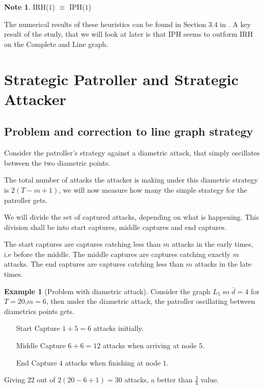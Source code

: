 \documentclass[a4paper,10pt]{article}
\theoremstyle{definition}
\theoremstyle{definition}
\newtheorem{example}[theorem]{Example}
\theoremstyle{remark}
\theoremstyle{definition}
\newtheorem*{note}{Note}
\begin{document}
\begin{note}
IRH($1$) $\equiv$ IPH($1$)
\end{note}

The numerical results of these heuristics can be found in Section 3.4 in \citep{Lin2013}. A key result of the study, that we will look at later is that IPH seems to outform IRH on the Complete and Line graph.

\section{Strategic Patroller and Strategic Attacker}

\subsection{Problem and correction to line graph strategy}
\label{Subsection:Problem and correction to line graph strategy}
Consider the patroller's strategy against a diametric attack, that simply oscillates between the two diametric points.

The total number of attacks the attacker is making under this diametric strategy is $2(T-m+1)$, we will now measure how many the simple strategy for the patroller gets.

We will divide the set of captured attacks, depending on what is happening. This division shall be into start captures, middle captures and end captures.

The start captures are captures catching less than $m$ attacks in the early times, i.e before the middle. The middle captures are captures catching exactly $m$ attacks. The end captures are captures catching less than $m$ attacks in the late times.

\begin{example}[Problem with diametric attack]
Consider the graph $L_{5}$ so $\bar{d}=4$ for $T=20$,$m=6$, then under the diametric attack, the patroller oscillating between diametrics points gets.
\begin{itemize}
\item[Start] Capture $1+5=6$ attacks initially.
\item[Middle] Capture $6+6=12$ attacks when arriving at node $5$.
\item[End] Capture $4$ attacks when finishing at node $1$.
\end{itemize}
Giving $22$ out of $2(20-6+1)=30$ attacks, a better than $\frac{3}{4}$ value.
\end{example}
\end{document}
